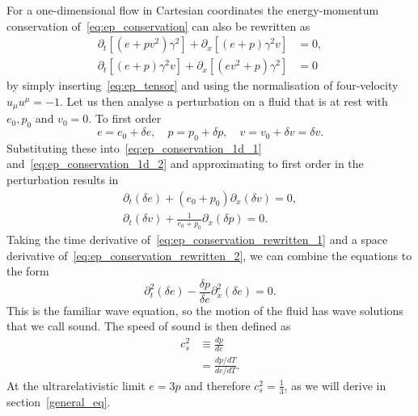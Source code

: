 For a one-dimensional flow in Cartesian coordinates the energy-momentum conservation of~\eqref{eq:ep_conservation} can also be rewritten as
\begin{align}
\partial_t \left[ (e+pv^2) \gamma^2 \right] + \partial_x \left[ (e+p) \gamma^2 v \right] &= 0,
\label{eq:ep_conservation_1d_1} \\
\partial_t \left[ (e+p) \gamma^2 v \right] + \partial_x \left[ (ev^2 + p) \gamma^2 \right] &= 0
\label{eq:ep_conservation_1d_2}
\end{align}
by simply inserting~\eqref{eq:ep_tensor} and using the normalisation of four-velocity $u_\mu u^\mu = -1$.
Let us then analyse a perturbation on a fluid that is at rest with $e_0, p_0$ and $v_0 = 0$.
To first order
\begin{equation}
e = e_0 + \delta e, \quad p=p_0 + \delta p, \quad v = v_0 + \delta v = \delta v.
\end{equation}
Substituting these into~\eqref{eq:ep_conservation_1d_1} and~\eqref{eq:ep_conservation_1d_2} and approximating to first order in the perturbation results in
\begin{align}
\partial_t (\delta e) + (e_0 + p_0) \partial_x (\delta v) = 0,
\label{eq:ep_conservation_rewritten_1} \\
\partial_t (\delta v) + \frac{1}{e_0 + p_0} \partial_x (\delta p) = 0.
\label{eq:ep_conservation_rewritten_2}
\end{align}
Taking the time derivative of~\eqref{eq:ep_conservation_rewritten_1} and a space derivative of~\eqref{eq:ep_conservation_rewritten_2}, we can combine the equations to the form
\begin{equation}
\partial_t^2 (\delta e) - \frac{\delta p}{\delta e} \partial_x^2(\delta e) = 0.
\label{eq:wave_equation}
\end{equation}
This is the familiar wave equation,
so the motion of the fluid has wave solutions that we call sound.
\cites[ch. 4.3]{rezzolla_relativistic_2013}[ch. 7.4]{lecture_notes}
The speed of sound is then defined as
\cites[eq. 2.168]{rezzolla_relativistic_2013}[eq. 13]{giese_2020}[eq. 3]{giese_2021}
\begin{align}
c_s^2
&\equiv \frac{dp}{de}
\label{eq:cs2_compact} \\
&= \frac{dp/dT}{de/dT}.
\label{eq:cs2_explicit}
\end{align}
At the ultrarelativistic limit $e=3p$ and therefore $c_s^2=\frac{1}{3}$, as we will derive in section~\ref{general_eq}.

